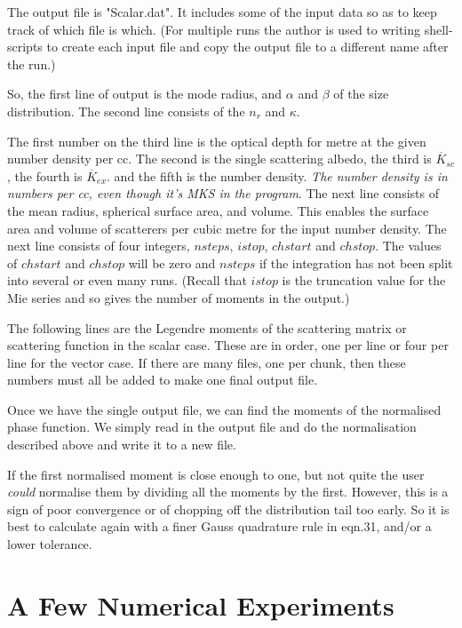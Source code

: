 \begin{flushleft}
The output file is "Scalar.dat". It includes some of the 
input data so as to keep track of which file is which. (For multiple
runs the author is used to writing shell-scripts to create each input file
and copy the output file to a different name after the run.)

So, the first line of output is the mode radius, and $\alpha$ and $\beta$ 
of the size distribution. The second line consists of the $n_r$ and $\kappa$.

The first number on the third line is the optical depth for metre at
the given number density per cc. The second is the single scattering albedo,
the third is ${\overline K_{sc}}$, the fourth is ${\overline K_{ex}}$.
and the fifth is the number density. {\it The number density is
 in numbers per cc, even though it's MKS in the program}.
The next line consists of the mean radius, spherical surface area, and volume.
This enables the surface area and volume of scatterers per cubic metre 
for the input number density.
The next line consists of four integers, $nsteps$, $istop$, $chstart$ and $chstop$.
The values of $chstart$ and $chstop$ will be zero and $nsteps$ if the integration
has not been split into several or even many runs. (Recall that $istop$ is the 
truncation value for the Mie series and so gives the number of moments in 
the output.)

The following lines are the Legendre moments of the scattering matrix
or scattering function in the scalar case.  These are in order, one per 
line or four per line for the vector case. If there are many files, one per chunk,
then these numbers must all be added to make one final output file.

Once we have the single output file, we can find the moments
of the normalised phase function. We simply read in the output file
and do the normalisation described above and write it to a new file.

If the first normalised moment is close enough to one, but not quite 
the user {\it could} normalise them by dividing all the moments by the first.
However, this is a sign of poor convergence or of chopping off the distribution
tail too early. So it is best to  calculate again with a finer Gauss quadrature 
rule in eqn.31, and/or a lower tolerance.


\end{flushleft}


\section{A Few Numerical Experiments}

